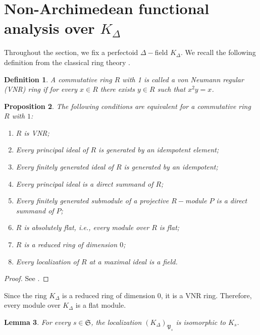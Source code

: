 \documentclass[12pts,a4paper]{amsart}
\newtheorem{proposition}{Proposition}[section]
\newtheorem{lemma}[proposition]{Lemma}
\newtheorem{definition}[proposition]{Definition}
\begin{document}
\section{Non-Archimedean functional analysis over $K_\Delta$}

Throughout the section, we fix a perfectoid $\Delta-$field $K_\Delta$. We recall the following definition from the classical ring theory \cite{Goode}.

\begin{definition}
    A commutative ring $R$ with 1 is called a \emph{von Neumann regular (VNR)} ring if for every $x\in R$ there exists $y\in R$ such that $x^2y=x$.
\end{definition}

\begin{proposition}
    The following conditions are equivalent for a commutative ring $R$ with $1$:
    \begin{enumerate}
        \item[(i).] $R$ is VNR;
        \item[(ii).] Every principal ideal of $R$ is generated by an idempotent element;
        \item[(iii).] Every finitely generated ideal of $R$ is generated by an idempotent;
        \item[(iv).] Every principal ideal is a direct summand of $R$;
        \item[(v).] Every finitely generated submodule of a projective $R-$module $P$ is a direct summand of $P$;
        \item[(vi).] $R$ is absolutely flat, i.e., every module over $R$ is flat;
        \item[(vii).] $R$ is a reduced ring of dimension $0$;
        \item[(viii).] Every localization of $R$ at a maximal ideal is a field.
    \end{enumerate}
\end{proposition}

\begin{proof}
    See \cite{Goode}.
\end{proof}

Since the ring $K_\Delta$ is a reduced ring of dimension $0$, it is a VNR ring. Therefore, every module over $K_\Delta$ is a flat module. 

\begin{lemma}
  For every $s\in\mathfrak{S}$, the localization $(K_\Delta)_{\mathfrak{P}_s}$ is isomorphic to $K_s$.
\end{lemma}
\end{document}
